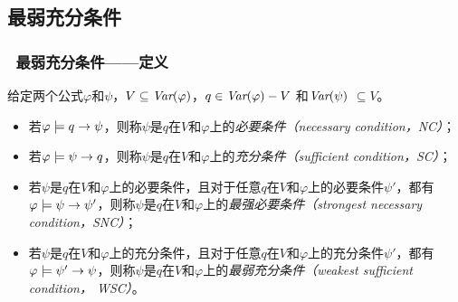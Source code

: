 \documentclass[9pt, CJK]{beamer}
\begin{document}
\subsection{最弱充分条件}
\begin{frame}
	\frametitle{~最弱充分条件——{\footnotesize 定义}}
	{\footnotesize
		\begin{definition}[充分和必要条件]\label{def:NC:SC}
			给定两个公式$\varphi$和$\psi$，$V \subseteq \textit{Var}(\varphi)$，$q\in\textit{Var}(\varphi)- V$
			和$\textit{Var}(\psi)$ $\subseteq V$。
			\begin{itemize}
				\item 若$\varphi \models q \rightarrow \psi$，则称$\psi$是$q$在$V$和$\varphi$上的{\em 必要条件（necessary condition，NC）}；
				\item 若$\varphi \models \psi\rightarrow q$，则称$\psi$是$q$在$V$和$\varphi$上的{\em 充分条件（sufficient condition，SC）}；
				\item 若$\psi$是$q$在$V$和$\varphi$上的必要条件，且对于任意$q$在$V$和$\varphi$上的必要条件$\psi'$，都有$\varphi\models\psi\rightarrow\psi'$，则称$\psi$是$q$在$V$和$\varphi$上的{\em 最强必要条件（strongest necessary condition，SNC）}；
				\item 若$\psi$是$q$在$V$和$\varphi$上的充分条件，且对于任意$q$在$V$和$\varphi$上的充分条件$\psi'$，都有$\varphi\models\psi'\rightarrow\psi$，则称$\psi$是$q$在$V$和$\varphi$上的{\em 最弱充分条件（weakest sufficient condition， WSC）}。
			\end{itemize}
		\end{definition}
	}
\end{frame}
\end{document}

